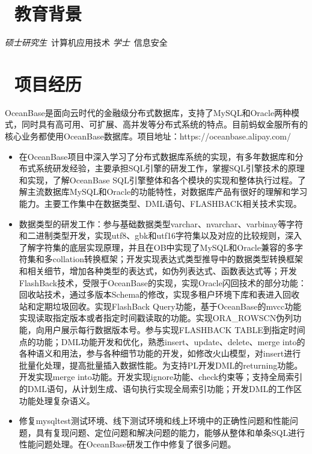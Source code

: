 \documentclass{resume}
\begin{document}


\section{\faGraduationCap\  教育背景}
\textit{硕士研究生}\ 计算机应用技术
\datedsubsection{\textbf{电子科技大学}}{2009 -- 2013}
\textit{学士}\ 信息安全\

\section{\faUsers\ 项目经历}
OceanBase是面向云时代的金融级分布式数据库，支持了MySQL和Oracle两种模式，同时具有高可用、可扩展、高并发等分布式系统的特点。目前蚂蚁金服所有的核心业务都使用OceanBase数据库。项目地址：https://oceanbase.alipay.com/
\begin{itemize}
  \item 在OceanBase项目中深入学习了分布式数据库系统的实现，有多年数据库和分布式系统研发经验，主要承担SQL引擎的研发工作，掌握SQL引擎技术的原理和实现，了解OceanBase SQL引擎整体和各个模块的实现和整体执行过程。了解主流数据库MySQL和Oracle的功能特性，对数据库产品有很好的理解和学习能力。主要工作集中在数据类型、DML语句、FLASHBACK相关技术实现。
  \item 数据类型的研发工作：参与基础数据类型varchar、nvarchar、varbinay等字符和二进制类型开发，实现utf8、gbk和utf16字符集以及对应的比较规则，深入了解字符集的底层实现原理，并且在OB中实现了MySQL和Oracle兼容的多字符集和多collation转换框架；开发实现表达式类型推导中的数据类型转换框架和相关细节，增加各种类型的表达式，如伪列表达式、函数表达式等；开发FlashBack技术，受限于OceanBase的实现，实现Oracle闪回技术的部分功能：回收站技术，通过多版本Schema的修改，实现多租户环境下库和表进入回收站和定期垃圾回收。实现FlashBack Query功能，基于OceanBase的mvcc功能实现读取指定版本或者指定时间戳读取的功能。实现ORA\_ROWSCN伪列功能，向用户展示每行数据版本号。参与实现FLASHBACK TABLE到指定时间点的功能；DML功能开发和优化，熟悉insert、update、delete、merge into的各种语义和用法，参与各种细节功能的开发，如修改火山模型，对insert进行批量化处理，提高批量插入数据性能。为支持PL开发DML的returning功能。开发实现merge into功能。开发实现ignore功能、check约束等；支持全局索引的DML语句，从计划生成、语句执行实现全局索引功能；开发DML的工作区功能处理复杂语义。
  \item 修复mysqltest测试环境、线下测试环境和线上环境中的正确性问题和性能问题，具有复现问题、定位问题和解决问题的能力，能够从整体和单条SQL进行性能问题处理。在OceanBase研发工作中修复了很多问题。
\end{itemize}
\end{document}
